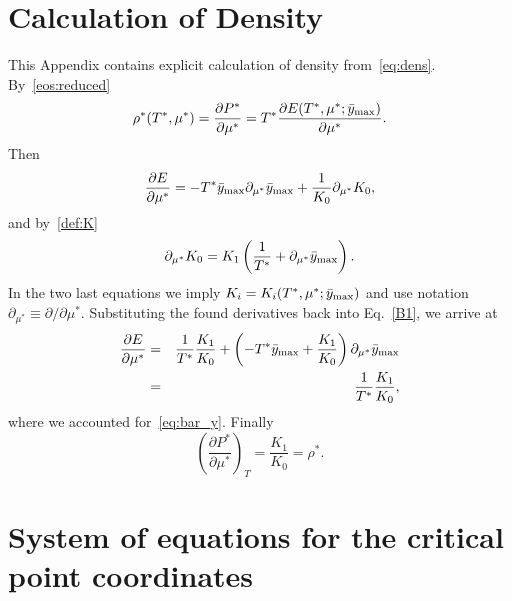 \documentclass[12pt]{article}
\numberwithin{equation}{section}
\begin{document}
	\pagebreak	
		
	\section{\label{sec:app:dens} Calculation of Density}
	This Appendix contains explicit calculation of density from~\eqref{eq:dens}. By~\eqref{eos:reduced}
	\begin{equation}
		\label{B1}
		\rho^*(T^*,\mu^*) = \frac{\partial P^*}{\partial \mu^*} = T^* \frac{\partial E(T^*,\mu^*;\bar{y}_{\rm max})}{\partial \mu^*}.
	\end{equation}
	Then
	\begin{equation}
		\frac{\partial E}{\partial \mu^*} = -T^* \bar{y}_{\rm max} \partial_{\mu^*} \bar{y}_{\rm max} + \frac{1}{K_0} \partial_{\mu^*} K_0,
	\end{equation}
	and by~\eqref{def:K}
	\begin{equation}
		\partial_{\mu^*} K_0 = K_1\left(\frac{1}{T^*} + \partial_{\mu^*} \bar{y}_{\rm max}\right).
	\end{equation}
	In the two last equations we imply $K_i = K_i(T^*,\mu^*;\bar{y}_{\rm max})$ and use notation $\partial_{\mu^*} \equiv \partial / \partial \mu^*$.
	Substituting the found derivatives back into Eq.~\eqref{B1}, we arrive at
	\begin{eqnarray}
		\frac{\partial E}{\partial \mu^*} & = & \frac{1}{T^*} \frac{K_1}{K_0} + \left(-T^*\bar{y}_{\rm max} + \frac{K_1}{K_0}\right)\partial_{\mu^*}\bar{y}_{\rm max}
		\nonumber\\
		& = & \frac{1}{T^*} \frac{K_1}{K_0},
	\end{eqnarray}
	where we accounted for~\eqref{eq:bar_y}.
	Finally
	\begin{equation}
		\left(\frac{\partial P^*}{\partial \mu^*} \right)_T = \frac{K_1}{K_0} = \rho^*.
	\end{equation}
	
	\section{\label{sec:app:cp} System of equations for the critical point coordinates}
	
\end{document}
